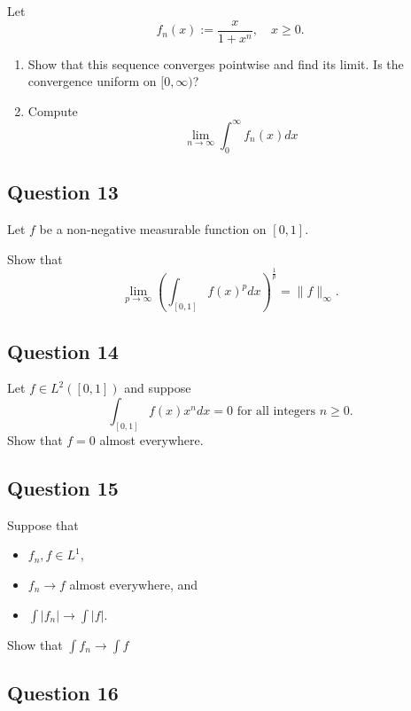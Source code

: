 \documentclass[12pt]{article}
\providecommand{\tightlist}{%
  \setlength{\itemsep}{0pt}\setlength{\parskip}{0pt}}
\begin{document}
Let \[
f_{n}(x):=\frac{x}{1+x^{n}}, \quad x \geq 0.
\]

\begin{enumerate}
\def\labelenumi{\alph{enumi}.}
\item
  Show that this sequence converges pointwise and find its limit. Is the
  convergence uniform on \([0, \infty)\)?
\item
  Compute \[
  \lim _{n \rightarrow \infty} \int_{0}^{\infty} f_{n}(x) d x
  \]
\end{enumerate}

\hypertarget{question-13-1}{%
\subsection{Question 13}\label{question-13-1}}

Let \(f\) be a non-negative measurable function on \([0, 1]\).

Show that \[
\lim _{p \rightarrow \infty}\left(\int_{[0,1]} f(x)^{p} d x\right)^{\frac{1}{p}}=\|f\|_{\infty}.
\]

\hypertarget{question-14-1}{%
\subsection{Question 14}\label{question-14-1}}

Let \(f\in L^2([0, 1])\) and suppose \[
\int_{[0,1]} f(x) x^{n} d x=0 \text { for all integers } n \geq 0.
\] Show that \(f = 0\) almost everywhere.

\hypertarget{question-15-1}{%
\subsection{Question 15}\label{question-15-1}}

Suppose that

\begin{itemize}
\tightlist
\item
  \(f_n, f \in L^1\),
\item
  \(f_n \to f\) almost everywhere, and
\item
  \(\int\left|f_{n}\right| \rightarrow \int|f|\).
\end{itemize}

Show that \(\int f_{n} \rightarrow \int f\)

\hypertarget{question-16-1}{%
\subsection{Question 16}\label{question-16-1}}
\end{document}

